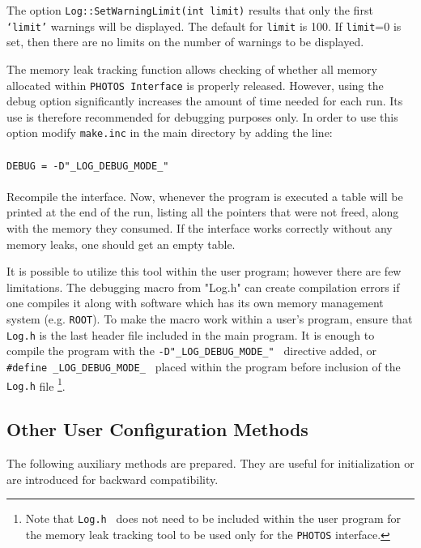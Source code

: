 \documentclass[]{Photos_interface_design}
\begin{document}
The option {\tt Log::SetWarningLimit(int limit)} results that
only the first {\tt `limit'} warnings will be  displayed. The default for {\tt limit} is 100. 
If {\tt limit}=0 is set, then there are no limits on the number of warnings to be displayed.

The memory leak tracking function allows checking of whether all memory allocated within {\tt PHOTOS Interface}
 is properly released. However, using the debug option significantly increases the amount of time needed for 
each run. Its  use is therefore recommended  for debugging purposes only. In order to use this option
 modify {\tt make.inc} in the main directory by adding the line: \\
\\ {\tt DEBUG = -D"\_LOG\_DEBUG\_MODE\_" } \\ \\
Recompile the interface.
Now, whenever the program is executed a table will be printed at the end of the run,
listing all the pointers that were not freed, along with the memory they consumed.
If the interface works correctly without any memory leaks, one should get an empty table.

It is possible to utilize this tool within the user program; however there are few limitations.
The debugging macro from "Log.h" can create compilation errors if one compiles
it along with software which has its own memory management system (e.g. {\tt ROOT}).
To make the macro work within a user's program, ensure that {\tt Log.h} is the last header file
included in the main program.
It is enough to  compile the program with the {\tt -D"\_LOG\_DEBUG\_MODE\_" } directive added,
or {\tt \#define \_LOG\_DEBUG\_MODE\_ } placed within the program before inclusion of
 the {\tt Log.h} file%
\footnote{Note that {\tt Log.h } does not need to be included within
the user program  for the memory leak tracking tool to be used only for the {\tt PHOTOS} interface.
}.

\subsection{Other User Configuration Methods}
\label{subsection:other_methods}

The following auxiliary methods are prepared. They are useful for initialization 
or are introduced for backward compatibility.
\end{document}
